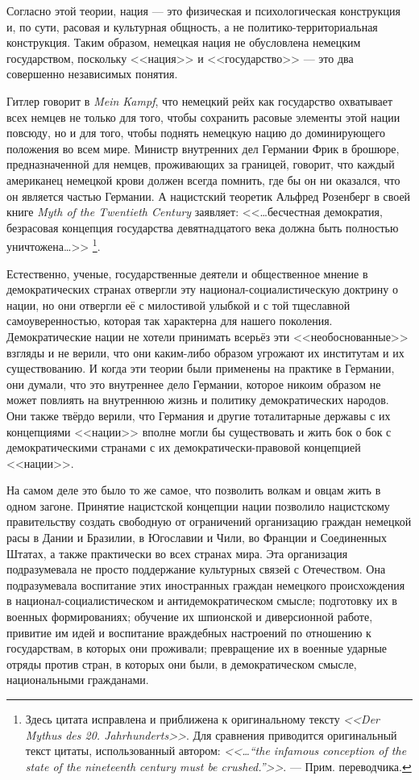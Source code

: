 Согласно этой теории, нация — это физическая и психологическая конструкция и, по сути, расовая и культурная общность, а не политико-территориальная конструкция. Таким образом, немецкая нация не обусловлена немецким государством, поскольку <<нация>> и <<государство>> — это два совершенно независимых понятия.

Гитлер говорит в \textit{Mein Kampf}, что немецкий рейх как государство охватывает всех немцев не только для того, чтобы сохранить расовые элементы этой нации повсюду, но и для того, чтобы поднять немецкую нацию до доминирующего положения во всем мире. Министр внутренних дел Германии Фрик в брошюре, предназначенной для немцев, проживающих за границей, говорит, что каждый американец немецкой крови должен всегда помнить, где бы он ни оказался, что он является частью Германии. А нацистский теоретик Альфред Розенберг в своей книге \textit{Myth of the Twentieth Century} заявляет: <<\ldots бесчестная демократия, безрасовая концепция государства девятнадцатого века должна быть полностью уничтожена\ldots>>
\footnote{%
Здесь цитата исправлена и приближена к оригинальному тексту \textit{<<Der Mythus des 20. Jahrhunderts>>}. Для сравнения приводится оригинальный текст цитаты, использованный автором: \textit{<<\ldots``the infamous conception of the state of the nineteenth century must be crushed.''>>}. — Прим. переводчика.}.

Естественно, ученые, государственные деятели и общественное мнение в демократических странах отвергли эту национал-социалистическую доктрину о нации, но они отвергли её с милостивой улыбкой и с той тщеславной самоуверенностью, которая так характерна для нашего поколения. Демократические нации не хотели принимать всерьёз эти <<необоснованные>> взгляды и не верили, что они каким-либо образом угрожают их институтам и их существованию. И когда эти теории были применены на практике в Германии, они думали, что это внутреннее дело Германии, которое никоим образом не может повлиять на внутреннюю жизнь и политику демократических народов. Они также твёрдо верили, что Германия и другие тоталитарные державы с их концепциями <<нации>> вполне могли бы существовать и жить бок о бок с демократическими странами с их демократически-правовой концепцией <<нации>>.

На самом деле это было то же самое, что позволить волкам и овцам жить в одном загоне. Принятие нацистской концепции нации позволило нацистскому правительству создать свободную от ограничений организацию граждан немецкой расы в Дании и Бразилии, в Югославии и Чили, во Франции и Соединенных Штатах, а также практически во всех странах мира. Эта организация подразумевала не просто поддержание культурных связей с Отечеством. Она подразумевала воспитание этих иностранных граждан немецкого происхождения в национал-социалистическом и антидемократическом смысле; подготовку их в военных формированиях; обучение их шпионской и диверсионной работе, привитие им идей и воспитание враждебных настроений по отношению к государствам, в которых они проживали; превращение их в военные ударные отряды против стран, в которых они были, в демократическом смысле, национальными гражданами.

